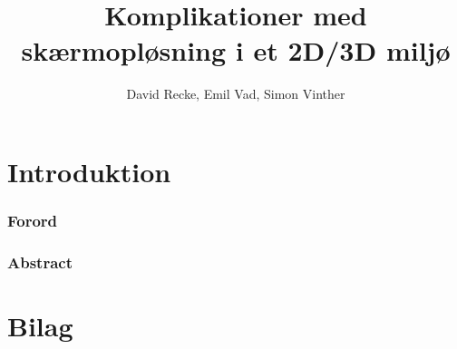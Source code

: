 \documentclass{report}
\author{David Recke, Emil Vad, Simon Vinther}
\title{Komplikationer med skærmopløsning i et 2D/3D miljø}
\begin{document}
		
	\chapter{Introduktion}
		\subsection{Forord}
		
	\subsection{Abstract}
		
		\cite{Garat}
		\cite{goossens93}
		\cite{derbo}
	
	

	\clearpage	
	\chapter{Bilag}
\printbibliography
\end{document}
